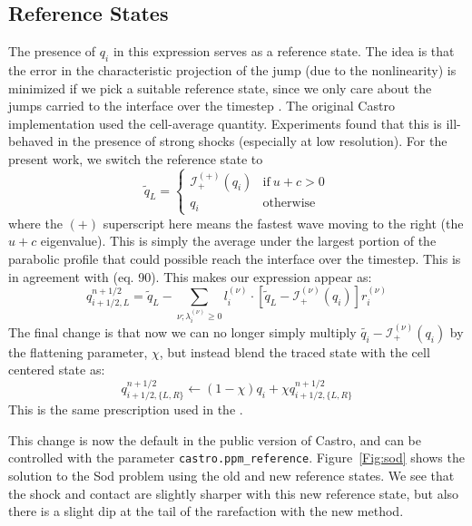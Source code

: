 \documentclass[12pt,preprint]{aastex}
\begin{document}
\subsection{Reference States}

The presence of $q_i$ in this expression serves as a reference state.
The idea is that the error in the characteristic projection of the
jump (due to the nonlinearity) is minimized if we pick a suitable
reference state, since we only care about the jumps carried to the
interface over the timestep \citep{colellaglaz1985}.  The original
Castro implementation used the cell-average quantity.  Experiments
found that this is ill-behaved in the presence of strong shocks
(especially at low resolution). For the present work, we switch the
reference state to
\begin{equation}
\label{eq:refchoice}
\tilde{q}_L = \left \{ \begin{array}{cc}
       \mathcal{I}_+^{(+)}(q_i) & \mathrm{if~} u + c > 0 \\
       q_i                    & \mathrm{otherwise}
\end{array}
\right .
\end{equation}
where the $(+)$ superscript here means the fastest wave moving to the right
(the $u+c$ eigenvalue).   This is simply the average under the largest
portion of the parabolic profile that could possible reach the interface 
over the timestep.  This is
in agreement with \citet{ppmunsplit} (eq. 90).  This makes our
expression appear as:
\begin{equation}
\label{eq:ppmstatel}
q_{i+1/2,L}^{n+1/2} = \tilde{q}_L -
   \sum_{\nu;\lambda_i^{(\nu)}\ge 0} l_i^{(\nu)} \cdot \left [
        \tilde{q}_L  - \mathcal{I}^{(\nu)}_+(q_i)
       \right ] r_i^{(\nu)}
\end{equation}
The final change is that now we can no longer simply multiply
$\tilde{q_i} - \mathcal{I}^{(\nu)}_+(q_i)$ by the flattening
parameter, $\chi$, but instead blend the traced state with the cell
centered state as:
  \begin{equation}
  q_{i+1/2,\{L,R\}}^{n+1/2} \leftarrow (1 - \chi) q_i + \chi q_{i+1/2,\{L,R\}}^{n+1/2}
  \end{equation}
This is the same prescription used in the \cite{ppm}.

This change is now the default in the public version of Castro,
and can be controlled with the parameter {\tt castro.ppm\_reference}.
Figure~\ref{Fig:sod} shows the
solution to the Sod problem using the old and new reference states.
We see that the shock and contact are slightly sharper with this new
reference state, but also there is a slight dip at the tail of the
rarefaction with the new method.
\end{document}

